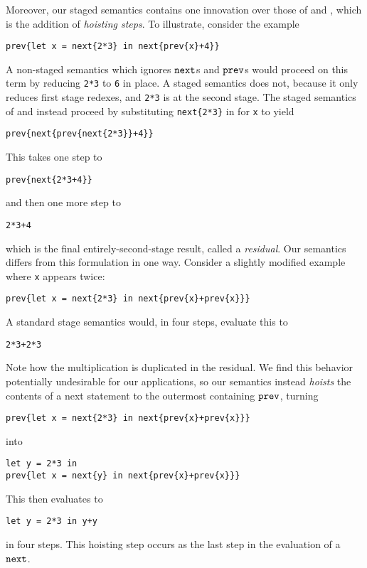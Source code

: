 Moreover, our staged semantics contains one innovation over those of 
\cite{davies96} and \cite{taha-thesis-99}, which is the addition
of {\em hoisting steps}.  
To illustrate, consider the example
\begin{lstlisting}
prev{let x = next{2*3} in next{prev{x}+4}}
\end{lstlisting}
A non-staged semantics which ignores ${\tt next}$s and ${\tt prev}$s
would proceed on this term by reducing \verb|2*3| to \verb|6| in place.
A staged semantics does not, because it only reduces first stage redexes, and
\verb|2*3| is at the second stage.  
The staged semantics of \cite{davies96} and \cite{taha-thesis-99} instead proceed by
substituting \verb|next{2*3}| in for \verb|x| to yield
\begin{lstlisting}
prev{next{prev{next{2*3}}+4}}
\end{lstlisting}
This takes one step to 
\begin{lstlisting}
prev{next{2*3+4}}
\end{lstlisting}
and then one more step to
\begin{lstlisting}
2*3+4
\end{lstlisting}
which is the final entirely-second-stage result, called a {\em residual}.
Our semantics differs from this formulation in one way.
Consider a slightly modified example where \verb|x| appears twice:
\begin{lstlisting}
prev{let x = next{2*3} in next{prev{x}+prev{x}}}
\end{lstlisting}
A standard stage semantics would, in four steps, evaluate this to 
\begin{lstlisting}
2*3+2*3
\end{lstlisting}
Note how the multiplication is duplicated in the residual.
We find this behavior potentially undesirable for our applications,
so our semantics instead {\em hoists} the contents of a next statement 
to the outermost containing ${\tt prev}$, turning
\begin{lstlisting}
prev{let x = next{2*3} in next{prev{x}+prev{x}}}
\end{lstlisting}
into
\begin{lstlisting}
let y = 2*3 in
prev{let x = next{y} in next{prev{x}+prev{x}}}
\end{lstlisting}
This then evaluates to 
\begin{lstlisting}
let y = 2*3 in y+y
\end{lstlisting}
in four steps.  
This hoisting step occurs as the last step in the evaluation of a ${\tt next}$.

